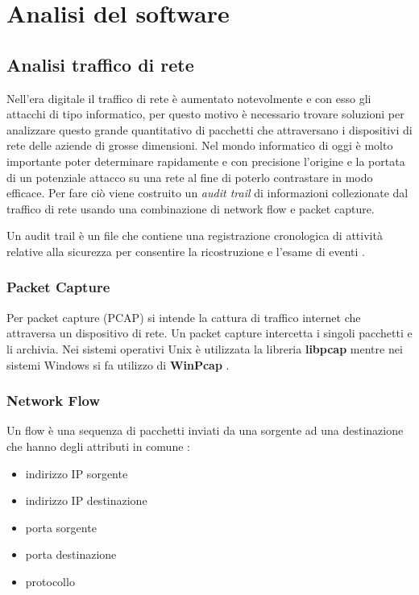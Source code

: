 \documentclass[../main.tex]{subfiles}
\begin{document}
\chapter{Analisi del software}

\section{Analisi traffico di rete}

Nell'era digitale il traffico di rete è aumentato notevolmente e con esso gli attacchi di tipo informatico, per questo motivo è necessario trovare soluzioni per analizzare questo grande quantitativo di pacchetti che attraversano i dispositivi di rete delle aziende di grosse dimensioni. Nel mondo informatico di oggi è molto importante poter determinare rapidamente e con precisione l'origine e la portata di un potenziale attacco su una rete al fine di poterlo contrastare in modo efficace.
Per fare ciò viene costruito un \textit{audit trail} di informazioni collezionate dal traffico di rete usando una combinazione di network flow e packet capture.

Un audit trail è un file che contiene una registrazione cronologica di attività relative alla sicurezza per consentire la ricostruzione e l'esame di eventi \cite{auditTrail}.

\subsection{Packet Capture}
Per packet capture (PCAP) si intende la cattura di traffico internet che attraversa un dispositivo di rete. Un packet capture intercetta i singoli pacchetti e li archivia. Nei sistemi operativi Unix è utilizzata la libreria \textbf{libpcap} mentre nei sistemi Windows si fa utilizzo di \textbf{WinPcap} \cite{pcap}.

\subsection{Network Flow}
Un flow è una sequenza di pacchetti inviati da una sorgente ad una destinazione che hanno degli attributi in comune \cite{trafficflow}:
\begin{itemize}
				\item indirizzo IP sorgente
				\item indirizzo IP destinazione
				\item porta sorgente
				\item porta destinazione
				\item protocollo
\end{itemize}
\end{document}
